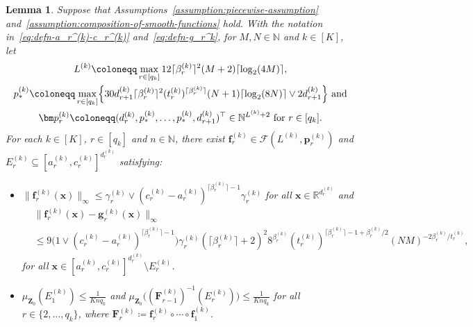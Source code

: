 \documentclass[12pt]{article}
\newtheorem{lemma}[thm]{Lemma}
\begin{document}
\begin{lemma} \label{lemma:approximate-each-Holder-component}
    Suppose that Assumptions~\ref{assumption:piecewise-assumption} and~\ref{assumption:composition-of-smooth-functions} hold. With the notation in~\eqref{eq:defn-a_r^(k)-c_r^(k)} and~\eqref{eq:defn-g_r^k}, for $M,N\in\mathbb{N}$ and $k\in[K]$, let 
    \begin{gather*}
    L^{(k)} \coloneqq \max_{r\in[q_k]} 12\lceil \beta^{(k)}_r \rceil^2(M+2)\lceil\log_2(4M)\rceil,\\
    p^{(k)}_* \coloneqq \max_{r\in[q_k]} \Bigl\{30 d_{r+1}^{(k)}  \lceil\beta^{(k)}_r\rceil^2 (t^{(k)}_r)^{\lceil\beta^{(k)}_r\rceil} (N+1)\lceil\log_2(8N)\rceil \vee 2 d_{r+1}^{(k)}\Bigr\} \text{ and}\\
    \bm p^{(k)}_r \coloneqq (d^{(k)}_r, p^{(k)}_*,\ldots, p^{(k)}_*, d^{(k)}_{r+1})^\top \in \mathbb{N}^{L^{(k)}+2} \text{ for } r\in[q_k].
    \end{gather*}
    For each $k\in[K]$, $r \in [q_k]$ and $n\in\mathbb{N}$, there exist $\bm f^{(k)}_r \in \mathcal{F}(L^{(k)},\bm p^{(k)}_r)$ and $E_r^{(k)} \subseteq [a^{(k)}_r,c^{(k)}_r]^{d^{(k)}_r}$ satisfying:
    \begin{itemize}
        \item[(i)] $\|\bm f_r^{(k)}(\bm x)\|_{\infty} \leq \gamma_r^{(k)} \vee (c_r^{(k)} - a_r^{(k)})^{\lceil \beta_r^{(k)} \rceil-1} \gamma_r^{(k)}$ for all $\bm x \in \mathbb{R}^{d_r^{(k)}}$ and
        \begin{align*}
            &\bigl\|\bm f^{(k)}_r(\bm x) - \bm g^{(k)}_r(\bm x)\bigr\|_{\infty}\\
            & \leq 9 \bigl( 1 \vee (c_r^{(k)} - a_r^{(k)})^{\lceil \beta_r^{(k)} \rceil - 1} \bigr) \gamma^{(k)}_r (\lceil \beta^{(k)}_r \rceil +2)^2 8^{\beta_r^{(k)}} (t^{(k)}_r)^{\lceil \beta_r^{(k)} \rceil - 1 + \beta^{(k)}_r/2} (NM)^{-2\beta^{(k)}_r / t^{(k)}_r},
        \end{align*}
        for all $\bm x \in [a^{(k)}_r,c^{(k)}_r]^{d^{(k)}_r} \setminus E^{(k)}_r$.
        \item[(ii)] $\mu_{\bm Z_0}(E^{(k)}_1) \leq \frac{1}{Kn q_k}$ and $\mu_{\bm Z_0}\bigl((\bm F^{(k)}_{r-1})^{-1}(E^{(k)}_r)\bigr) \leq \frac{1}{Kn q_k}$ for all $r\in\{2,\ldots,q_k\}$, where $\bm F^{(k)}_r \coloneqq \bm f^{(k)}_r \circ \cdots\circ \bm f^{(k)}_1$. 
    \end{itemize}
\end{lemma}
\end{document}
